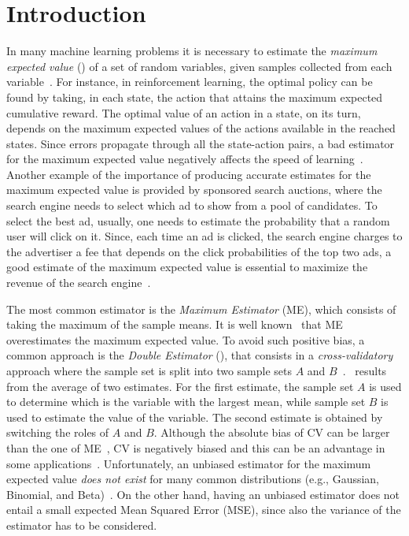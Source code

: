\section{Introduction}\label{S:Introduction}
In many machine learning problems it is necessary to estimate the \emph{maximum expected value} (\MEV) of a set of random variables, given samples collected from each variable~\cite{van2013estimating}.
For instance, in reinforcement learning, the optimal policy can be found by taking, in each state, the action that attains the maximum expected cumulative reward.
The optimal value of an action in a state, on its turn, depends on the maximum expected values of the actions available in the reached states.
Since errors propagate through all the state-action pairs, a bad estimator for the maximum expected value negatively affects the speed of learning~\cite{van2010double}.
Another example of the importance of producing accurate estimates for the maximum expected value is provided by sponsored search auctions, where the search engine needs to select which ad to show from a pool of candidates.
To select the best ad, usually, one needs to estimate the probability that a random user will click on it.
Since, each time an ad is clicked, the search engine charges to the advertiser a fee that depends on the click probabilities of the top two ads, a good estimate of the maximum expected value is essential to maximize the revenue of the search engine~\cite{xu2013mab}.

The most common estimator is the \emph{Maximum Estimator} (ME), which consists of taking the maximum of the sample means.
It is well known~\cite{smith2006optimizer,van2004rational,van2010double} that ME overestimates the maximum expected value.
To avoid such positive bias, a common approach is the \emph{Double Estimator} (\CV), that consists in a \emph{cross-validatory} approach where the sample set is split into two sample sets $A$ and $B$~\cite{stone1974cross}. \CV~results from the average of two estimates.
For the first estimate, the sample set $A$ is used to determine which is the variable with the largest mean, while sample set $B$ is used to estimate the value of the variable.
The second estimate is obtained by switching the roles of $A$ and $B$.
Although the absolute bias of CV can be larger than the one of ME~\cite{van2013estimating}, CV is negatively biased and this can be an advantage in some applications~\cite{van2010double,xu2013mab,van2015deep}.
Unfortunately, an unbiased estimator for the maximum expected value \emph{does not exist} for many common distributions (e.g., Gaussian, Binomial, and Beta)~\cite{blumenthal1968estimation,dhariyal85}.
On the other hand, having an unbiased estimator does not entail a small expected Mean Squared Error (MSE), since also the variance of the estimator has to be considered.

